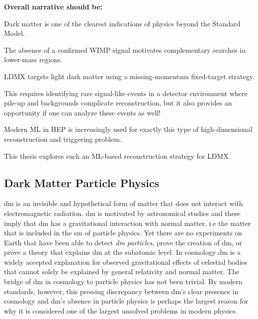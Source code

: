 





































\textbf{Overall narrative should be:}

Dark matter is one of the clearest indications of physics beyond the Standard Model.

The absence of a confirmed WIMP signal motivates complementary searches in lower-mass regions.

LDMX targets light dark matter using a missing-momentum fixed-target strategy.

This requires identifying rare signal-like events in a detector environment where pile-up and backgrounds complicate reconstruction, but it also provides an opportunity if one can analyze these events as well!

Modern ML in HEP is increasingly used for exactly this type of high-dimensional reconstruction and triggering problem.

This thesis explores such an ML-based reconstruction strategy for LDMX.


\subsection{Dark Matter Particle Physics}
\label{sec:dm_particle_physics}


\gls{dm} is an invisible and hypothetical form of matter that does not interact with electromagnetic radiation. \gls{dm} is motivated by astronomical studies and these imply that \gls{dm} has a gravitational interaction with normal matter, i.e the matter that is included in the \gls{sm} of particle physics. Yet there are no experiments on Earth that have been able to detect \textit{\gls{dm} particles}, prove the creation of \gls{dm}, or prove a theory that explains \gls{dm} at the subatomic level. In cosmology \gls{dm} is a widely accepted explanation for observed gravitational effects of celestial bodies that cannot solely be explained by general relativity and normal matter. The bridge of \gls{dm} in cosmology to particle physics has not been trivial. By modern standards, however, this pressing discrepancy between \gls{dm}'s clear presence in cosmology and \gls{dm}'s absence in particle physics is perhaps the largest reason for why it is considered one of the largest unsolved problems in modern physics. \cite{bertone2016-history-dark-matter} \cite{cirelli2026-darkmatter} 

